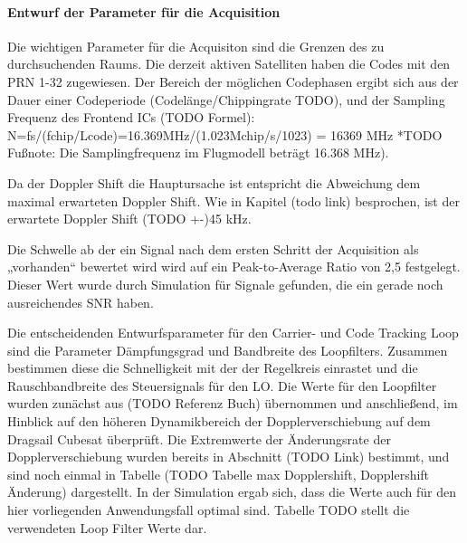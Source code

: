 

\paragraph{Entwurf der Parameter für die Acquisition}
Die wichtigen Parameter für die Acquisiton sind die Grenzen des zu durchsuchenden Raums.
Die derzeit aktiven Satelliten haben die Codes mit den PRN 1-32 zugewiesen. Der Bereich der möglichen Codephasen ergibt sich aus der Dauer einer Codeperiode (Codelänge/Chippingrate TODO), und der Sampling Frequenz des Frontend ICs (TODO Formel): N=fs/(fchip/Lcode)=16.369MHz/(1.023Mchip/s/1023) = 16369 MHz *TODO Fußnote: Die Samplingfrequenz im Flugmodell beträgt 16.368 MHz).

Da der Doppler Shift die Hauptursache ist entspricht die Abweichung dem maximal erwarteten Doppler Shift. Wie in Kapitel (todo link) besprochen, ist der erwartete Doppler Shift (TODO +-)45 kHz.

Die Schwelle ab der ein Signal nach dem ersten Schritt der Acquisition als „vorhanden“ bewertet wird wird auf ein Peak-to-Average Ratio von 2,5 festgelegt. Dieser Wert wurde durch Simulation für Signale gefunden, die ein gerade noch ausreichendes SNR haben.




Die entscheidenden Entwurfsparameter für den Carrier- und Code Tracking Loop sind die Parameter Dämpfungsgrad und Bandbreite des Loopfilters. Zusammen bestimmen diese die Schnelligkeit mit der der Regelkreis einrastet und die Rauschbandbreite des Steuersignals für den LO.
Die Werte für den Loopfilter wurden zunächst aus (TODO Referenz Buch) übernommen und anschließend, im Hinblick auf den höheren Dynamikbereich der Dopplerverschiebung auf dem Dragsail Cubesat überprüft. Die Extremwerte der Änderungsrate der Dopplerverschiebung wurden bereits in Abschnitt (TODO Link) bestimmt, und sind noch einmal in Tabelle (TODO Tabelle max Dopplershift, Dopplershift Änderung) dargestellt.
In der Simulation ergab sich, dass die Werte auch für den hier vorliegenden Anwendungsfall optimal sind. Tabelle TODO stellt die verwendeten Loop Filter Werte dar.

